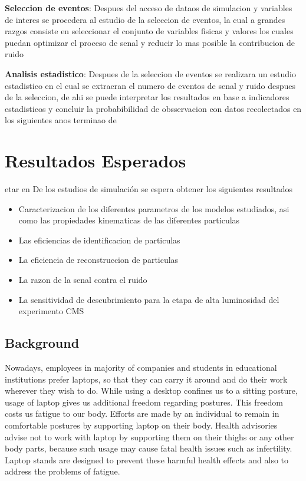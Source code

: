 {\bf Seleccion de eventos}: Despues del acceso de dataos de simulacion y variables de interes se procedera al estudio de la seleccion de eventos, la cual a grandes razgos consiste en seleccionar el conjunto de variables fisicas y valores los cuales puedan optimizar el proceso de senal y reducir lo mas posible la contribucion de ruido 

{\bf Analisis estadistico}: Despues de la seleccion de eventos se realizara un estudio estadistico en el cual se extraeran el numero de eventos de senal y ruido despues de la seleccion, de ahi se puede interpretar los resultados en base a indicadores estadisticos y concluir la probabibilidad de obsservacion con datos recolectados en los siguientes anos terminao de


\chapter{Resultados Esperados} 

etar en De los estudios de simulaci\'on se espera obtener los siguientes resultados

\begin{itemize}
\item Caracterizacion de los diferentes parametros de los modelos estudiados, asi como las propiedades kinematicas de las diferentes particulas 
\item Las eficiencias de identificacion de particulas 
\item La eficiencia de reconstruccion de particulas 
\item La razon de la senal contra el ruido 
\item La sensitividad de descubrimiento para la etapa de alta luminosidad del experimento CMS
\end{itemize}






\iffalse

\section{Background}

Nowadays, employees in majority of companies and students in educational institutions prefer laptops, so that they can carry it around and do their work wherever they wish to do. While using a desktop confines us to a sitting posture, usage of laptop gives us additional freedom regarding postures. This freedom costs us fatigue to our body. Efforts are made by an individual to remain in comfortable postures by supporting laptop on their body. Health advisories advise not to work with laptop by supporting them on their thighs or any other body parts, because such usage may cause fatal health issues such as infertility. Laptop stands are designed to prevent these harmful health effects and also to address the problems of fatigue.  


